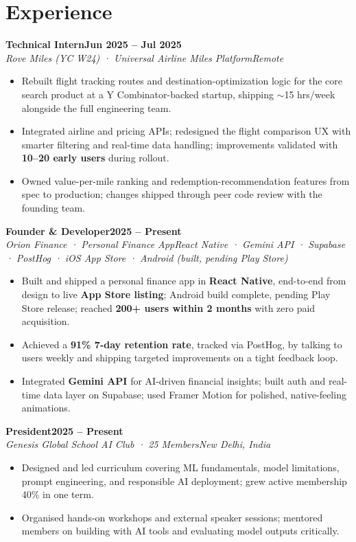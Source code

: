 \documentclass[10.4pt,letterpaper]{article}
\newcommand{\sub}[4]{%
  \vspace{2pt}%
  {\bfseries #1}\hfill{\bfseries\small #2}\\[-1pt]%
  \textit{\small #3}\hfill{\textit{\small #4}}%
  \vspace{1pt}%
}
\newenvironment{tlist}{%
  \begin{itemize}[leftmargin=1.3em, nosep, topsep=2pt, itemsep=0.5pt]%
  \small%
}{%
  \end{itemize}%
}
\begin{document}
\section{Experience}

\sub{Technical Intern}{Jun 2025 – Jul 2025}{Rove Miles (YC W24) · Universal Airline Miles Platform}{Remote}
\begin{tlist}
  \item Rebuilt flight tracking routes and destination-optimization logic for the core search product at a Y Combinator-backed startup, shipping $\sim$15 hrs/week alongside the full engineering team.
  \item Integrated airline and pricing APIs; redesigned the flight comparison UX with smarter filtering and real-time data handling; improvements validated with \textbf{10–20 early users} during rollout.
  \item Owned value-per-mile ranking and redemption-recommendation features from spec to production; changes shipped through peer code review with the founding team.
\end{tlist}

\vspace{3pt}
\sub{Founder \& Developer}{2025 – Present}{Orion Finance · Personal Finance App}{React Native · Gemini API · Supabase · PostHog · iOS App Store · Android (built, pending Play Store)}
\begin{tlist}
  \item Built and shipped a personal finance app in \textbf{React Native}, end-to-end from design to live \textbf{App Store listing}; Android build complete, pending Play Store release; reached \textbf{200+ users within 2 months} with zero paid acquisition.
  \item Achieved a \textbf{91\% 7-day retention rate}, tracked via PostHog, by talking to users weekly and shipping targeted improvements on a tight feedback loop.
  \item Integrated \textbf{Gemini API} for AI-driven financial insights; built auth and real-time data layer on Supabase; used Framer Motion for polished, native-feeling animations.
\end{tlist}

\vspace{3pt}
\sub{President}{2025 – Present}{Genesis Global School AI Club · 25 Members}{New Delhi, India}
\begin{tlist}
  \item Designed and led curriculum covering ML fundamentals, model limitations, prompt engineering, and responsible AI deployment; grew active membership 40\% in one term.
  \item Organised hands-on workshops and external speaker sessions; mentored members on building with AI tools and evaluating model outputs critically.
\end{tlist}
\end{document}
